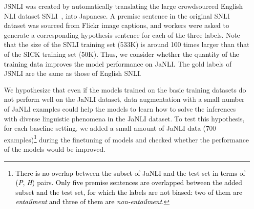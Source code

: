 \documentclass[11pt]{article}
\newcommand{\todo}[1]{\textcolor{black}{#1}}
\newcommand{\km}[1]{\textcolor{black}{#1}}
\begin{document}
JSNLI was created by automatically translating the large crowdsourced English NLI dataset SNLI~\cite{bowman-etal-2015-large}, into Japanese.
A premise sentence in the original SNLI dataset was sourced from Flickr image captions, and workers were asked
to generate a corresponding hypothesis sentence for each of the three labels.
Note that the size of the SNLI training set (533K) is around 100 times larger than that of the SICK training set (50K).
\km{Thus, we consider whether the quantity of the training data
improves the model performance on JaNLI.}
The gold labels of JSNLI are the same as those of English SNLI.

We hypothesize that even if the models trained on the basic training datasets do not perform well on the JaNLI dataset, data augmentation with a small number of JaNLI examples could help the models to learn how to solve the inferences with
diverse linguistic phenomena in the JaNLI dataset.
To test this hypothesis, for each baseline setting, we added a small amount of JaNLI data (700 examples)\footnote{\todo{There is no overlap between the subset of JaNLI and the test set in terms of (\textit{P}, \textit{H}) pairs.
Only five premise sentences are overlapped between the added subset and the test set, for which the labels are not biased: two of them are \textit{entailment} and three of them are \textit{non-entailment}.}}
during the finetuning of models and checked whether the performance of the models would be improved.
\end{document}
